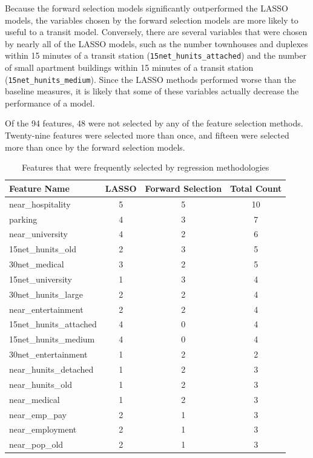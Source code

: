 \documentclass[11pt]{report}
\begin{document}
Because the forward selection models significantly outperformed the LASSO models, the variables chosen by the forward selection models are more likely to useful to a transit model. Conversely, there are several variables that were chosen by nearly all of the LASSO models, such as the number townhouses and duplexes within 15 minutes of a transit station (\texttt{15net\_hunits\_attached}) and the number of small apartment buildings within 15 minutes of a transit station (\texttt{15net\_hunits\_medium}). Since the LASSO methods performed worse than the baseline measures, it is likely that some of these variables actually decrease the performance of a model. 

Of the 94 features, 48 were not selected by any of the feature selection methods. Twenty-nine features were selected more than once, and fifteen were selected more than once by the forward selection models. 

\begin{table}[H]
\begingroup\fontsize{10}{15}\selectfont
\centering
\begin{tabular}{lccc}
\toprule
Feature Name&LASSO&Forward Selection&Total Count\\
\midrule
near\_hospitality&5&5&10\\
parking&4&3&7\\
near\_university&4&2&6\\
15net\_hunits\_old&2&3&5\\
30net\_medical&3&2&5\\
15net\_university&1&3&4\\
30net\_hunits\_large&2&2&4\\
near\_entertainment&2&2&4\\
15net\_hunits\_attached&4&0&4\\
15net\_hunits\_medium&4&0&4\\
30net\_entertainment&1&2&2\\
near\_hunits\_detached&1&2&3\\
near\_hunits\_old&1&2&3\\
near\_medical&1&2&3\\
near\_emp\_pay&2&1&3\\
near\_employment&2&1&3\\
near\_pop\_old&2&1&3\\
\end{tabular}
\caption{Features that were frequently selected by regression methodologies}\label{tab:featuresum}
\endgroup
\end{table}
\end{document}
